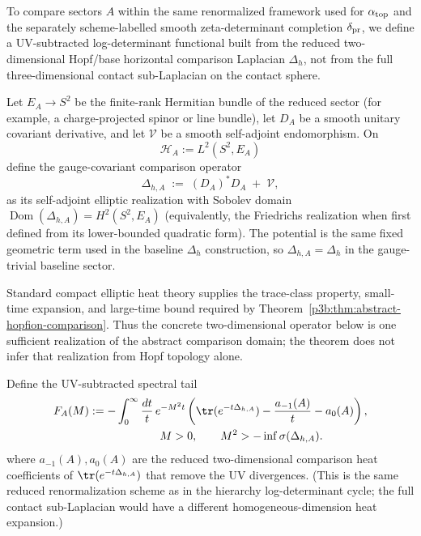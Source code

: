\documentclass[11pt,a4paper]{article}
\begin{document}
To compare sectors \(A\) within the same renormalized framework used for
\(\alpha_{\rm top}\) and the separately scheme-labelled smooth
zeta-determinant completion \(\delta_{\rm pr}\), we define a UV-subtracted
log-determinant functional
built from the reduced two-dimensional Hopf/base horizontal comparison
Laplacian \(\Delta_h\), not from the full three-dimensional contact
sub-Laplacian on the contact sphere.

Let \(E_A\to S^2\) be the finite-rank Hermitian bundle of the reduced sector
(for example, a charge-projected spinor or line bundle), let \(D_A\) be a
smooth unitary covariant derivative, and let \(\mathcal V\) be a smooth
self-adjoint endomorphism.  On
\[
 \mathcal H_A:=L^2(S^2,E_A)
\]
define the gauge-covariant comparison operator
\begin{equation}
\label{p3:eq:DeltaA}
\Delta_{h,A} \;:=\; (D_A)^\ast D_A \;+\;\mathcal{V},
\end{equation}
as its self-adjoint elliptic realization with Sobolev domain
\(\operatorname{Dom}(\Delta_{h,A})=H^2(S^2,E_A)\) (equivalently, the
Friedrichs realization when first defined from its lower-bounded quadratic
form).  The potential is the same fixed geometric term used in the baseline
\(\Delta_h\) construction, so \(\Delta_{h,A}=\Delta_h\) in the
gauge-trivial baseline sector.

Standard compact elliptic heat theory supplies the trace-class property,
small-time expansion, and large-time bound required by
Theorem~\ref{p3b:thm:abstract-hopfion-comparison}.  Thus the concrete
two-dimensional operator below is one sufficient realization of the abstract
comparison domain; the theorem does not infer that realization from Hopf
topology alone.

Define the UV-subtracted spectral tail
\begin{equation}
\label{p3:eq:FA-def}
\begin{aligned}
F_A(M)
&:=-\int_{0}^{\infty}\frac{dt}{t}\,e^{-M^2 t}
\left(\tr(e^{-t\Delta_{h,A}})-\frac{a_{-1}(A)}{t}-a_0(A)\right),\\
&\hspace{2.2cm} M>0,
\qquad M^2>-\inf\sigma(\Delta_{h,A}).
\end{aligned}
\end{equation}
where \(a_{-1}(A),a_0(A)\) are the reduced two-dimensional comparison heat coefficients of \(\tr(e^{-t\Delta_{h,A}})\) that remove the UV
divergences. (This is the same reduced renormalization scheme as in the hierarchy log-determinant cycle; the full contact sub-Laplacian would have a different homogeneous-dimension heat expansion.)
\end{document}
